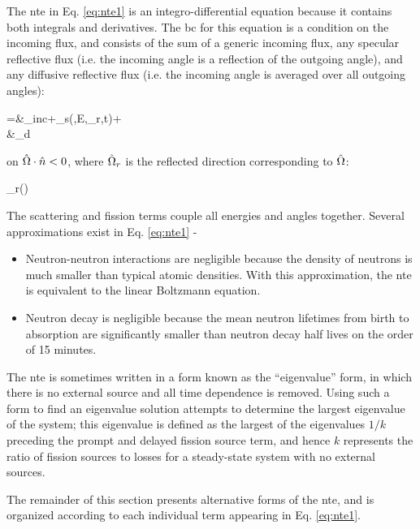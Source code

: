 The \gls{nte} in Eq. \eqref{eq:nte1} is an integro-differential equation because it contains both integrals and derivatives. The \gls{bc} for this equation is a condition on the incoming flux, and consists of the sum of a generic incoming flux, any specular reflective flux (i.e. the incoming angle is a reflection of the outgoing angle), and any diffusive reflective flux (i.e. the incoming angle is averaged over all outgoing angles):

\beqa
\psi\seat=&\psi_{inc}\seat+\alpha_s\seat\psi(,E,\hO_r,t)+\\
&\hspace{1cm}\alpha_d\seat{}
\eeqa

on \(\hat{\Omega}\cdot\hat{n}<0\), where \(\hat{\Omega}_r\) is the reflected direction corresponding to \(\hat{\Omega}\):

\beq
\label{eq:hOrDef}
\hO_r\equiv{}\left(\hO\cdot{}\right)
\eeq

The scattering and fission terms couple all energies and angles together. Several approximations exist in Eq. \eqref{eq:nte1} -

\begin{itemize}
\item Neutron-neutron interactions are negligible because the density of neutrons is much smaller than typical atomic densities. With this approximation, the \gls{nte} is equivalent to the linear Boltzmann equation.
\item Neutron decay is negligible because the mean neutron lifetimes from birth to absorption are significantly smaller than neutron decay half lives on the order of 15 minutes.
\end{itemize}

The \gls{nte} is sometimes written in a form known as the ``eigenvalue'' form, in which there is no external source and all time dependence is removed. Using such a form to find an eigenvalue solution attempts to determine the largest eigenvalue of the system; this eigenvalue is defined as the largest of the eigenvalues \(1/k\) preceding the prompt and delayed fission source term, and hence \(k\) represents the ratio of fission sources to losses for a steady-state system with no external sources.

The remainder of this section presents alternative forms of the \gls{nte}, and is organized according to each individual term appearing in Eq. \eqref{eq:nte1}.

